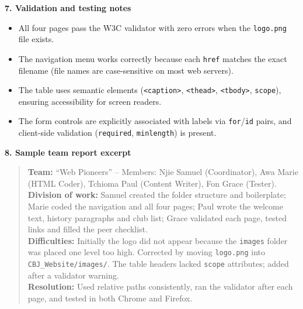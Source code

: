 \documentclass[11pt]{article}
\begin{document}
\textbf{7. Validation and testing notes}
\begin{itemize}
  \item All four pages pass the W3C validator with zero errors when the \texttt{logo.png} file exists.
  \item The navigation menu works correctly because each \texttt{href} matches the exact filename (file names are case-sensitive on most web servers).
  \item The table uses semantic elements (\texttt{<caption>}, \texttt{<thead>}, \texttt{<tbody>}, \texttt{scope}), ensuring accessibility for screen readers.
  \item The form controls are explicitly associated with labels via \texttt{for}/\texttt{id} pairs, and client-side validation (\texttt{required}, \texttt{minlength}) is present.
\end{itemize}

\textbf{8. Sample team report excerpt}
\begin{quote}
\textbf{Team:} ``Web Pioneers'' -- Members: Njie Samuel (Coordinator), Awa Marie (HTML Coder), Tchioma Paul (Content Writer), Fon Grace (Tester).\\
\textbf{Division of work:} Samuel created the folder structure and boilerplate; Marie coded the navigation and all four pages; Paul wrote the welcome text, history paragraphs and club list; Grace validated each page, tested links and filled the peer checklist.\\
\textbf{Difficulties:} Initially the logo did not appear because the \texttt{images} folder was placed one level too high. Corrected by moving \texttt{logo.png} into \texttt{CBJ\_Website/images/}. The table headers lacked \texttt{scope} attributes; added after a validator warning.\\
\textbf{Resolution:} Used relative paths consistently, ran the validator after each page, and tested in both Chrome and Firefox.
\end{quote}
\end{document}
